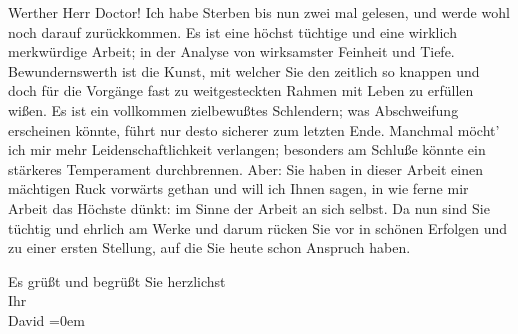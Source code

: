 \pstart\center{}Werther Herr Doctor!\pend\vspace{0.5em}
\pstart
           Ich habe Sterben bis nun zwei mal gelesen, und
               werde wohl noch darauf zurückkommen. Es ist eine höchst tüchtige und eine wirklich
               merkwürdige Arbeit; in der Analyse von wirksamster Feinheit und Tiefe.
               Bewundernswerth ist die Kunst, mit welcher Sie den zeitlich so knappen und doch für
               die Vorgänge fast zu weitgesteckten Rahmen mit Leben zu erfüllen wißen. Es ist ein
               vollkommen zielbewußtes Schlendern; was Abschweifung erscheinen könnte, führt nur
               desto sicherer zum letzten Ende. Manchmal möcht’ ich mir mehr Leidenschaftlichkeit
               verlangen; besonders am Schluße könnte ein stärkeres Temperament durchbrennen. Aber:
               Sie haben in dieser Arbeit
               einen mächtigen Ruck vorwärts gethan und will ich Ihnen sagen, in wie ferne mir
               Arbeit das Höchste dünkt: im Sinne der Arbeit an sich selbst. Da nun sind Sie tüchtig
               und ehrlich am Werke und darum rücken Sie vor in schönen Erfolgen und zu einer ersten
               Stellung, auf die Sie heute schon Anspruch haben.\pend
           
\pstart
           Es grüßt und begrüßt Sie herzlichst{\\[\baselineskip]}Ihr{\\[\baselineskip]}\spacefill\mbox{David}\pend
           \leftskip=0em{}\endnumbering{}  \newcommand{\dateiname}{L00411}\newcommand{\titel}{Jakob Julius David an Arthur Schnitzler, 23. 12. 1894}\newcommand{\editorInnen}{Martin Anton Müller und Gerd-Hermann Susen}
